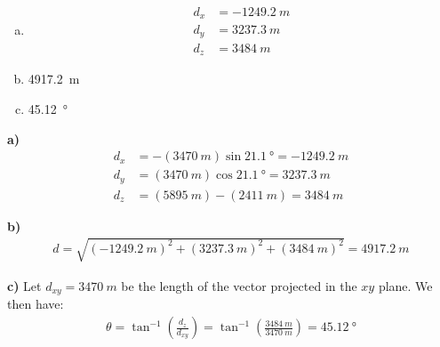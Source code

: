\begin{finalanswer}
\begin{enumerate}[(a)]
\item \begin{align*}
d_x &= -\SI{1249.2}{m}\\
d_y &= \SI{3237.3}{m}\\
d_z &= \SI{3484}{m}
\end{align*}
\item \SI{4917.2}{m}
\item \SI{45.12}{\degree}
\end{enumerate}
\end{finalanswer}
\begin{solution}
\textbf{a)} \begin{align*}
d_x &= -(\SI{3470}{m})\sin\SI{21.1}{\degree}=-\SI{1249.2}{m}\\
d_y &= (\SI{3470}{m})\cos\SI{21.1}{\degree}=\SI{3237.3}{m}\\
d_z &= (\SI{5895}{m})-(\SI{2411}{m})=\SI{3484}{m}
\end{align*}

\textbf{b)} \begin{align*}
d = \sqrt{(\SI{-1249.2}{m})^2+(\SI{3237.3}{m})^2+(\SI{3484}{m})^2}=\SI{4917.2}{m}
\end{align*}

\textbf{c)} Let $d_{xy}=\SI{3470}{m}$ be the length of the vector projected in the $xy$ plane. We then have:
\begin{align*}
\theta = \tan^{-1}\left( \frac{d_z}{d_{xy}} \right)= \tan^{-1}\left( \frac{\SI{3484}{m}}{\SI{3470}{m}} \right) = \SI{45.12}{\degree}
\end{align*}
\end{solution}

